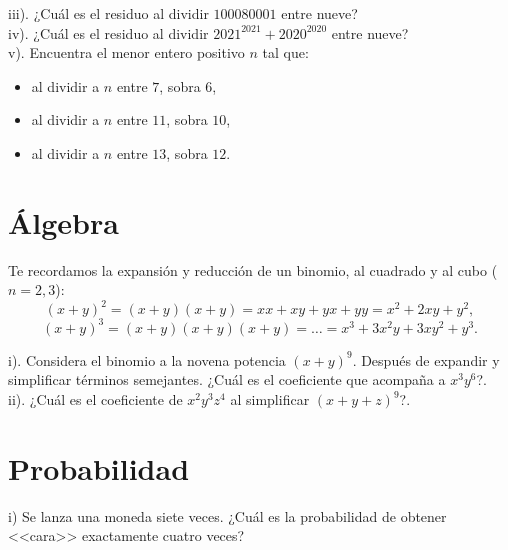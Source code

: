 
iii). ¿Cuál es el residuo al dividir $100080001$ entre nueve?\\


iv). ¿Cuál es el residuo al dividir $2021^{2021}+2020^{2020}$ entre nueve?\\


v). Encuentra el menor entero positivo $n$ tal que:
\begin{itemize}
\item al dividir a $n$ entre $7$, sobra $6$,
\item al dividir a $n$ entre $11$, sobra $10$,
\item al dividir a $n$ entre $13$, sobra $12$.
\end{itemize}



\section*{Álgebra}

Te recordamos la expansión y reducción de un binomio, al cuadrado y al cubo ($n=2,3$):
$$(x+y)^2=(x+y)(x+y)=xx+xy+yx+yy= x^2+2xy+y^2,$$
$$(x+y)^3=(x+y)(x+y)(x+y)=\dots = x^3+3x^2y+3xy^2+y^3.$$

i). Considera el binomio a la novena potencia $(x+y)^{9}$. Después de expandir y simplificar términos semejantes.  ¿Cuál es el coeficiente que acompaña a $x^3y^6$?.\\

ii). ¿Cuál es el coeficiente de $x^2y^3z^4$ al simplificar $(x+y+z)^{9}$?.


\section*{Probabilidad}

i) Se lanza una moneda siete veces. ¿Cuál es la probabilidad de obtener <<cara>> exactamente cuatro veces?\\

